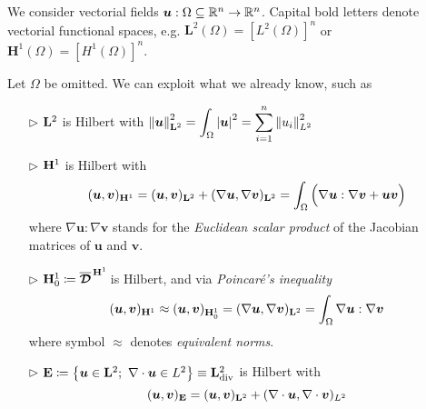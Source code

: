 



We consider vectorial fields $\bm{u}:\Omega\subseteq\mathbb{R}^n\to\mathbb{R}^n$. Capital bold letters denote vectorial functional spaces, e.g. $\mathbf{L}^2(\Omega)=\left[ L^2(\Omega) \right]^n$ or $\mathbf{H}^1(\Omega)= \left[ H^1(\Omega) \right]^n$.

\smallskip

Let $\Omega$ be omitted. We can exploit what we already know, such as
\begin{itemize}

\item[$\triangleright$] $\mathbf{L}^2$ is Hilbert with $\left\lVert \bm{u} \right\rVert_{\mathbf{L}^2}^2=\displaystyle\int_\Omega \left\lvert \bm{u} \right\rvert^2=\sum_{i=1}^n \left\lVert u_i \right\rVert^2_{L^2}$

\item[$\triangleright$] $\mathbf{H}^1$ is Hilbert with
\begin{equation*}
(\bm{u},\bm{v})_{\mathbf{H}^1}=(\bm{u},\bm{v})_{\mathbf{L}^2}+(\nabla\bm u,\nabla \bm v)_{\mathbf{L}^2}= \int_\Omega \Big( \nabla\bm u : \nabla \bm v + \bm u \bm v \Big)
\end{equation*}
where $\nabla\bm u:\nabla\bm v$ stands for the \emph{Euclidean scalar product} of the Jacobian matrices of $\bm u$ and $\bm v$. 

\item[$\triangleright$] $\mathbf{H}_0^1\coloneq\overline{\bm {\mathcal{D}}}^{\,\mathbf{H}^1}\!$ is Hilbert, and via \emph{Poincaré's inequality}
\begin{equation*}
(\bm u,\bm v)_{\mathbf{H}^1}\approx(\bm u,\bm v)_{\mathbf{H}^1_0}=(\nabla\bm u,\nabla \bm v)_{\mathbf{L}^2}=\int_\Omega \nabla\bm u : \nabla \bm v
\end{equation*}
where symbol $\approx$ denotes \emph{equivalent norms}.

\item[$\triangleright$] $\Ev\coloneq \left\{ \bm u\in \mathbf{L}^2;\ \nabla \cdot \bm u \in L^2 \right\}\equiv \Lv^2_{\text{div}}$ is Hilbert with
\begin{equation*}
(\bm u,\bm v)_{\mathbf{E}}=(\bm u,\bm v)_{\mathbf{L}^2}+(\nabla \cdot \bm u,\nabla \cdot\bm v)_{L^2} 
\end{equation*}


\end{itemize}
